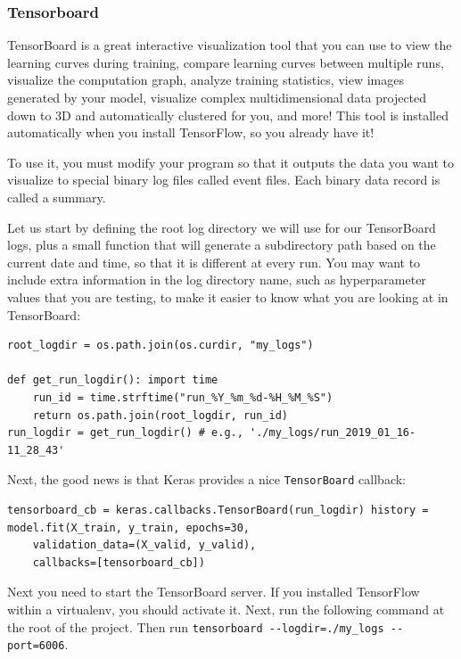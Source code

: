 \subsubsection{Tensorboard}
TensorBoard is a great interactive visualization tool that you can use to view the learning curves during training, compare learning curves between multiple runs, visualize the computation graph, analyze training statistics, view images generated by your model, visualize complex multidimensional data projected down to 3D and automatically clustered for you, and more! This tool is installed automatically when you install TensorFlow, so you already have it!

To use it, you must modify your program so that it outputs the data you want to visualize to special binary log files called event files. Each binary data record is called a summary.

Let us start by defining the root log directory we will use for our TensorBoard logs, plus a small function that will generate a subdirectory path based on the current date and time, so that it is different at every run. You may want to include extra information in the log directory name, such as hyperparameter values that you are testing, to make it easier to know what you are looking at in TensorBoard:

\begin{lstlisting}
root_logdir = os.path.join(os.curdir, "my_logs")

def get_run_logdir(): import time
    run_id = time.strftime("run_%Y_%m_%d-%H_%M_%S")
    return os.path.join(root_logdir, run_id)
run_logdir = get_run_logdir() # e.g., './my_logs/run_2019_01_16-11_28_43'
\end{lstlisting}

Next, the good news is that Keras provides a nice \lstinline+TensorBoard+ callback:

\begin{lstlisting}
tensorboard_cb = keras.callbacks.TensorBoard(run_logdir) history = model.fit(X_train, y_train, epochs=30,
	validation_data=(X_valid, y_valid),
    callbacks=[tensorboard_cb])
\end{lstlisting}

Next you need to start the TensorBoard server. If you installed TensorFlow within a virtualenv, you should activate it. Next, run the following command at the root of the project. Then run \lstinline+tensorboard --logdir=./my_logs --port=6006+.
